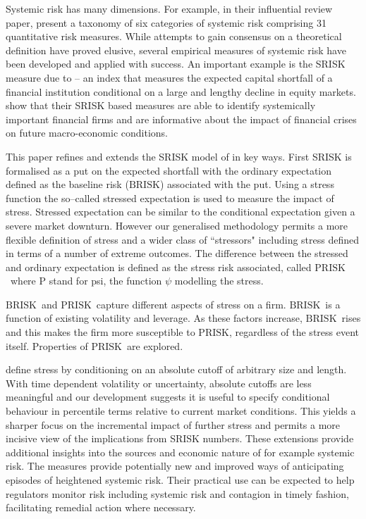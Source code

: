 \documentclass[authoryear]{elsarticle}
\newcommand{\br}{\ensuremath{\mathrm{BRISK}}}
\newcommand{\pr}{\ensuremath{\mathrm{PRISK}}}
\begin{document}
Systemic risk has many dimensions. For example, in their influential review paper, \cite{Bisias2012} present a taxonomy of six categories of systemic risk comprising 31 quantitative risk measures. While attempts to gain consensus on a theoretical definition have proved elusive, several empirical measures of systemic risk have been developed and applied with  success.  An important example is the SRISK measure due to \cite{brownlees2015} -- an index that measures the expected capital shortfall of a financial institution conditional on a large and lengthy decline in equity markets. \cite{brownlees2015} show that their SRISK based measures are able to identify systemically important financial firms and are informative about the impact of financial crises on future macro-economic conditions. 

This paper refines and extends the SRISK model of \cite{brownlees2015} in  key ways. First SRISK is formalised  as a put on the expected shortfall with the ordinary expectation defined as the baseline risk (\br) associated with the put.   Using a stress function  the so--called stressed expectation is used to measure the impact of stress.   Stressed expectation can be similar to the \cite{brownlees2015} conditional expectation given  a severe market downturn.  However our generalised methodology  permits a more flexible definition of stress and a wider class of ``stressors" including stress defined in terms of  a number of extreme outcomes.  The difference between the stressed and ordinary expectation is defined as the stress risk associated, called \pr\ where P stand for psi,  the function $\psi$ modelling the stress. 

\br\  and \pr\  capture different aspects of stress on a firm. \br\  is a function of existing volatility and leverage. As these factors increase, \br\  rises and this makes the firm more susceptible to \pr, regardless of the stress event itself.   Properties of \pr\  are explored.
   
\cite{brownlees2015} define stress by conditioning on an absolute cutoff of arbitrary size and length. With time dependent volatility or uncertainty, absolute cutoffs  are less meaningful and our development suggests  it is  useful to specify conditional behaviour in percentile terms relative to current market conditions. This yields a sharper focus on the incremental impact of further stress and permits a more incisive view of the  implications from SRISK numbers. These extensions provide additional insights into the sources and economic nature of for example systemic risk. The measures provide potentially new and improved ways of anticipating episodes of heightened systemic risk. Their practical use can be expected to help regulators monitor risk including systemic risk and contagion in timely fashion,   facilitating remedial action where necessary.
\end{document}
